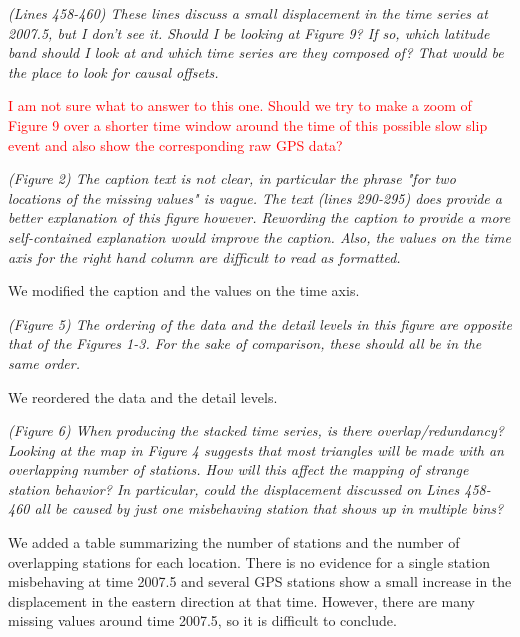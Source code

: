 \documentclass[letterpaper, 12pt]{article}
\begin{document}
\textit{(Lines 458-460) These lines discuss a small displacement in the time series at 2007.5, but I don't see it. Should I be looking at Figure 9? If so, which latitude band should I look at and which time series are they composed of? That would be the place to look for causal offsets.}

\bigskip

\textcolor{red}{I am not sure what to answer to this one. Should we try to make a zoom of Figure 9 over a shorter time window around the time of this possible slow slip event and also show the corresponding raw GPS data?}

\bigskip

\textit{(Figure 2) The caption text is not clear, in particular the phrase "for two locations of the missing values" is vague. The text (lines 290-295) does provide a better explanation of this figure however. Rewording the caption to provide a more self-contained explanation would improve the caption. Also, the values on the time axis for the right hand column are difficult to read as formatted.}

\bigskip

We modified the caption and the values on the time axis.

\bigskip

\textit{(Figure 5) The ordering of the data and the detail levels in this figure are opposite that of the Figures 1-3. For the sake of comparison, these should all be in the same order.}

\bigskip

We reordered the data and the detail levels.

\bigskip

\textit{(Figure 6) When producing the stacked time series, is there overlap/redundancy? Looking at the map in Figure 4 suggests that most triangles will be made with an overlapping number of stations. How will this affect the mapping of strange station behavior? In particular, could the displacement discussed on Lines 458-460 all be caused by just one misbehaving station that shows up in multiple bins?}

\bigskip

We added a table summarizing the number of stations and the number of overlapping stations for each location. There is no evidence for a single station misbehaving at time 2007.5 and several GPS stations show a small increase in the displacement in the eastern direction at that time. However, there are many missing values around time 2007.5, so it is difficult to conclude.
\end{document}

